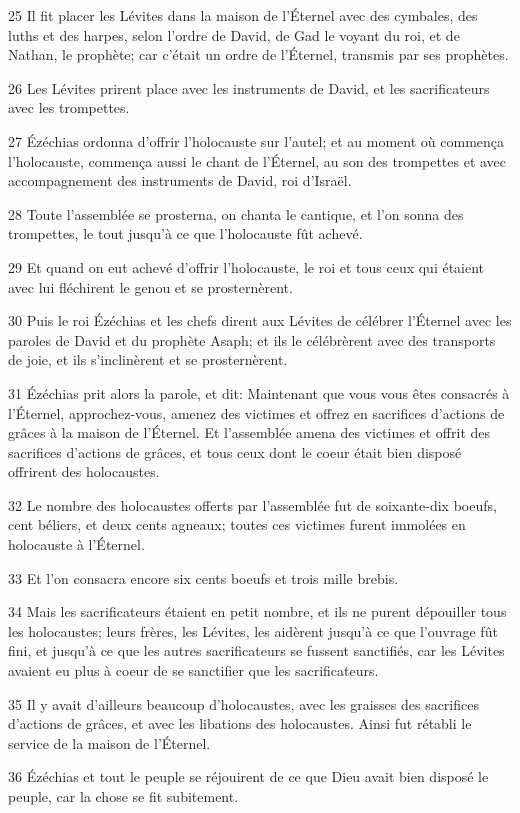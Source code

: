 \par 25 Il fit placer les Lévites dans la maison de l'Éternel avec des cymbales, des luths et des harpes, selon l'ordre de David, de Gad le voyant du roi, et de Nathan, le prophète; car c'était un ordre de l'Éternel, transmis par ses prophètes.
\par 26 Les Lévites prirent place avec les instruments de David, et les sacrificateurs avec les trompettes.
\par 27 Ézéchias ordonna d'offrir l'holocauste sur l'autel; et au moment où commença l'holocauste, commença aussi le chant de l'Éternel, au son des trompettes et avec accompagnement des instruments de David, roi d'Israël.
\par 28 Toute l'assemblée se prosterna, on chanta le cantique, et l'on sonna des trompettes, le tout jusqu'à ce que l'holocauste fût achevé.
\par 29 Et quand on eut achevé d'offrir l'holocauste, le roi et tous ceux qui étaient avec lui fléchirent le genou et se prosternèrent.
\par 30 Puis le roi Ézéchias et les chefs dirent aux Lévites de célébrer l'Éternel avec les paroles de David et du prophète Asaph; et ils le célébrèrent avec des transports de joie, et ils s'inclinèrent et se prosternèrent.
\par 31 Ézéchias prit alors la parole, et dit: Maintenant que vous vous êtes consacrés à l'Éternel, approchez-vous, amenez des victimes et offrez en sacrifices d'actions de grâces à la maison de l'Éternel. Et l'assemblée amena des victimes et offrit des sacrifices d'actions de grâces, et tous ceux dont le coeur était bien disposé offrirent des holocaustes.
\par 32 Le nombre des holocaustes offerts par l'assemblée fut de soixante-dix boeufs, cent béliers, et deux cents agneaux; toutes ces victimes furent immolées en holocauste à l'Éternel.
\par 33 Et l'on consacra encore six cents boeufs et trois mille brebis.
\par 34 Mais les sacrificateurs étaient en petit nombre, et ils ne purent dépouiller tous les holocaustes; leurs frères, les Lévites, les aidèrent jusqu'à ce que l'ouvrage fût fini, et jusqu'à ce que les autres sacrificateurs se fussent sanctifiés, car les Lévites avaient eu plus à coeur de se sanctifier que les sacrificateurs.
\par 35 Il y avait d'ailleurs beaucoup d'holocaustes, avec les graisses des sacrifices d'actions de grâces, et avec les libations des holocaustes. Ainsi fut rétabli le service de la maison de l'Éternel.
\par 36 Ézéchias et tout le peuple se réjouirent de ce que Dieu avait bien disposé le peuple, car la chose se fit subitement.


